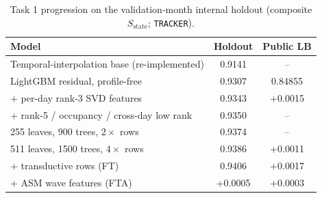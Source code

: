 \documentclass[conference,10pt]{IEEEtran}
\newcommand{\file}[1]{\texttt{\small #1}}
\begin{document}
\begin{table}[t]
\centering
\caption{Task 1 progression on the validation-month internal holdout (composite $S_\text{state}$; \file{TRACKER}).}
\label{tab:t1hold}
\begin{tabular}{lcc}
\toprule
Model & Holdout & Public LB \\
\midrule
Temporal-interpolation base (re-implemented) & 0.9141 & -- \\
LightGBM residual, profile-free & 0.9307 & 0.84855 \\
+ per-day rank-3 SVD features & 0.9343 & +0.0015 \\
+ rank-5 / occupancy / cross-day low rank & 0.9350 & -- \\
255 leaves, 900 trees, $2\times$ rows & 0.9374 & -- \\
511 leaves, 1500 trees, $4\times$ rows & 0.9386 & +0.0011 \\
+ transductive rows (FT) & 0.9406 & +0.0017 \\
+ ASM wave features (FTA) & +0.0005 & +0.0003 \\
\bottomrule
\end{tabular}
\end{table}
\end{document}
